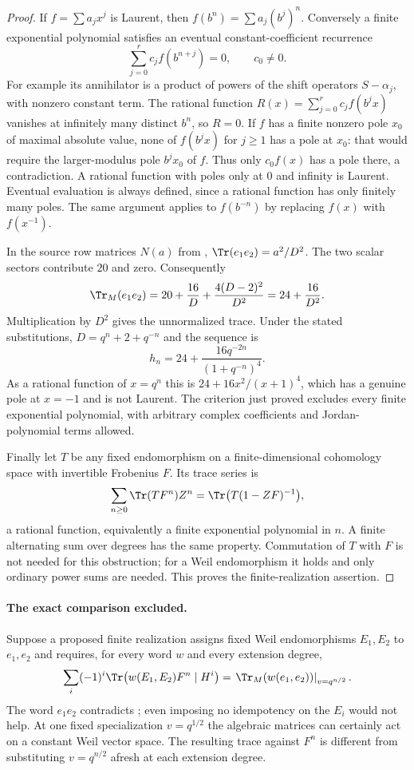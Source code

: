 \begin{proof}
If $f=\sum a_jx^j$ is Laurent, then $f(b^n)=\sum a_j(b^j)^n$.
Conversely a finite exponential polynomial satisfies an eventual
constant-coefficient recurrence
\[
 \sum_{j=0}^r c_j f(b^{n+j})=0,\qquad c_0\ne0.
\]
For example its annihilator is a product of powers of the shift
operators $S-\alpha_j$, with nonzero constant term. The rational
function $R(x)=\sum_{j=0}^r c_j f(b^jx)$ vanishes at infinitely many
distinct $b^n$, so $R=0$. If $f$ has a finite nonzero pole $x_0$ of
maximal absolute value, none of $f(b^jx)$ for $j\ge1$ has a pole at
$x_0$: that would require the larger-modulus pole $b^jx_0$ of $f$.
Thus only $c_0f(x)$ has a pole there, a contradiction. A rational
function with poles only at $0$ and infinity is Laurent. Eventual
evaluation is always defined, since a rational function has only
finitely many poles. The same argument applies to $f(b^{-n})$ by
replacing $f(x)$ with $f(x^{-1})$.

In the source row matrices $N(a)$ from ,
$\Tr(e_1e_2)=a^2/D^2$. The two scalar sectors contribute $20$ and zero.
Consequently
\[
 \Tr_M(e_1e_2)
 =20+\frac{16}{D}+\frac{4(D-2)^2}{D^2}
 =24+\frac{16}{D^2}.
\]
Multiplication by $D^2$ gives the unnormalized trace. Under the stated
substitutions, $D=q^n+2+q^{-n}$ and the sequence is
\[
 h_n=24+\frac{16q^{-2n}}{(1+q^{-n})^4}.
\]
As a rational function of $x=q^n$ this is
$24+16x^2/(x+1)^4$, which has a genuine pole at $x=-1$ and is not
Laurent. The criterion just proved excludes every finite exponential
polynomial, with arbitrary complex coefficients and Jordan-polynomial
terms allowed.

Finally let $T$ be any fixed endomorphism on a finite-dimensional
cohomology space with invertible Frobenius $F$. Its trace series is
\[
 \sum_{n\ge0}\Tr(TF^n)Z^n
 =\Tr\bigl(T(1-ZF)^{-1}\bigr),
\]
a rational function, equivalently a finite exponential polynomial in
$n$. A finite alternating sum over degrees has the same property.
Commutation of $T$ with $F$ is not needed for this obstruction; for a
Weil endomorphism it holds and only ordinary power sums are needed.
This proves the finite-realization assertion.
\end{proof}

\paragraph{The exact comparison excluded.}
Suppose a proposed finite realization assigns fixed Weil endomorphisms
$E_1,E_2$ to $e_1,e_2$ and requires, for every word $w$ and every
extension degree,
\[
 \sum_i(-1)^i\Tr\bigl(w(E_1,E_2)F^n\mid H^i\bigr)
 =\left.\Tr_M(w(e_1,e_2))\right|_{v=q^{n/2}}.
\]
The word $e_1e_2$ contradicts ; even imposing no idempotency
on the $E_i$ would not help. At one fixed specialization
$v=q^{1/2}$ the algebraic matrices can certainly act on a constant
Weil vector space. The resulting trace against $F^n$ is different
from substituting $v=q^{n/2}$ afresh at each extension degree.

